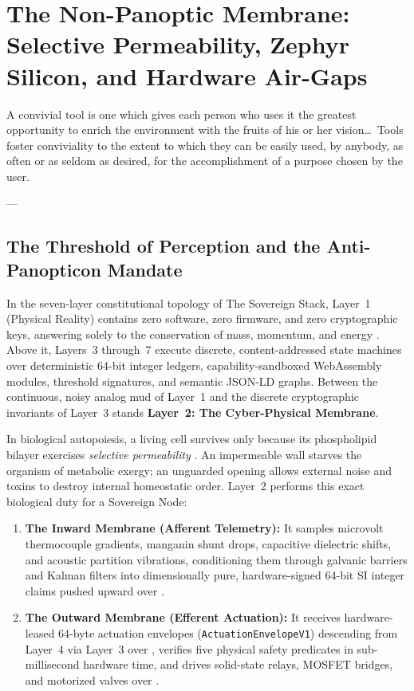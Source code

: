 \chapter{The Non-Panoptic Membrane: Selective Permeability, Zephyr Silicon, and Hardware Air-Gaps}
\label{ch:non-panoptic-membrane}

\epigraph{A convivial tool is one which gives each person who uses it the greatest opportunity to enrich the environment with the fruits of his or her vision\dots\ Tools foster conviviality to the extent to which they can be easily used, by anybody, as often or as seldom as desired, for the accomplishment of a purpose chosen by the user.}{--- \textcite{illich1973}}

\section{The Threshold of Perception and the Anti-Panopticon Mandate}
\label{sec:l2-threshold-anti-panopticon}

In the seven-layer constitutional topology of The Sovereign Stack, Layer~1 (Physical Reality) contains zero software, zero firmware, and zero cryptographic keys, answering solely to the conservation of mass, momentum, and energy \parencite{georgescu1971,odum1971}. Above it, Layers~3 through~7 execute discrete, content-addressed state machines over deterministic 64-bit integer ledgers, capability-sandboxed WebAssembly modules, threshold signatures, and semantic JSON-LD graphs. Between the continuous, noisy analog mud of Layer~1 and the discrete cryptographic invariants of Layer~3 stands \textbf{Layer~2: The Cyber-Physical Membrane}.

In biological autopoiesis, a living cell survives only because its phospholipid bilayer exercises \textit{selective permeability} \parencite{maturana1980,varela1979,margulis1998}. An impermeable wall starves the organism of metabolic exergy; an unguarded opening allows external noise and toxins to destroy internal homeostatic order. Layer~2 performs this exact biological duty for a Sovereign Node:
\begin{enumerate}
    \item \textbf{The Inward Membrane (Afferent Telemetry):} It samples microvolt thermocouple gradients, manganin shunt drops, capacitive dielectric shifts, and acoustic partition vibrations, conditioning them through galvanic barriers and Kalman filters into dimensionally pure, hardware-signed 64-bit SI integer claims pushed upward over .
    \item \textbf{The Outward Membrane (Efferent Actuation):} It receives hardware-leased 64-byte actuation envelopes (\texttt{ActuationEnvelopeV1}) descending from Layer~4 via Layer~3 over , verifies five physical safety predicates in sub-millisecond hardware time, and drives solid-state relays, MOSFET bridges, and motorized valves over .
\end{enumerate}

